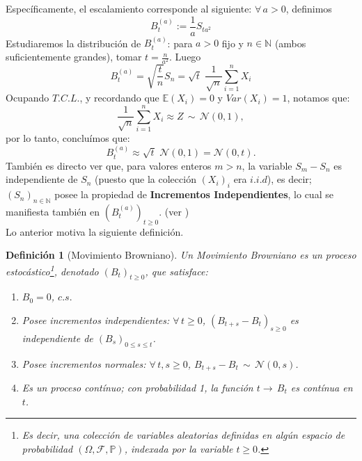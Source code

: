 \documentclass[a4paper]{article}
\newcommand{\prob}{\mathbb{P}}
\newtheorem{definicion}{Definición}
\numberwithin{equation}{subsection}
\numberwithin{definicion}{subsection}
\def\N{\mathbb N}
\def\E{\mathbb E}
\begin{document}
Específicamente, el escalamiento corresponde al siguiente: $\forall\, a>0$, definimos
\[B_t^{(a)}:= \frac{1}{a}S_{ta^2}\]
\newline Estudiaremos la distribución de $B_t^{(a)}$: para $a>0$ fijo y $n\in \N$ (ambos suficientemente grandes), tomar $t=\frac{n}{a^2}$. Luego
\[B_t^{(a)} = \sqrt{\frac{t}{n}}S_n = \sqrt{t}\,\, \frac{1}{\sqrt{n}}\sum_{i=1}^n X_i\]
Ocupando $T.C.L.$, y recordando que $\E(X_i)=0$ y $Var(X_i)=1$, notamos que:
\[\frac{1}{\sqrt{n}}\sum_{i=1}^n X_i \approx Z\,\sim\,\mathcal{N}(0,1), \]
por lo tanto, concluímos que:
\[B_t^{(a)} \approx \sqrt{t}\,\,\mathcal{N}(0,1) = \mathcal{N}(0,t).\]
También es directo ver que, para valores enteros $m>n$, la variable $S_m-S_n$ es independiente de $S_n$ (puesto que la colección $(X_i)_i$ era $i.i.d$), es decir; $(S_n)_{n\in\N}$ posee la propiedad de \textbf{Incrementos Independientes}, lo cual se manifiesta también en $(B_t^{(a)})_{t\geq 0}$. (ver \cite[cap. 2]{Kara})\\ \newline
Lo anterior motiva la siguiente definición.

\begin{definicion}[Movimiento Browniano] Un Movimiento Browniano es un proceso estocástico\footnote{Es decir, una colección de variables aleatorias definidas en algún espacio de probabilidad $(\Omega,\mathcal{F},\prob)$, indexada por la variable $t\geq 0$.}, denotado $(B_t)_{t\geq 0}$, que satisface:
\begin{enumerate}
    \item[i.] $B_0 = 0$, $c.s.$
    \item[ii.] Posee incrementos independientes: $\forall\, t\geq 0$, $(B_{t+s}-B_t)_{s\geq 0}$ es independiente de $(B_s)_{0\leq s\leq t}$.
    \item[iii.] Posee incrementos normales: $\forall\, t,s\geq 0$, $B_{t+s}-B_{t}\,\sim\,\mathcal{N}(0,s)$.
    \item[iv.] Es un proceso contínuo; con probabilidad 1, la función $t\rightarrow\,B_t$ es contínua en $t$.
\end{enumerate}
\end{definicion}
\end{document}
